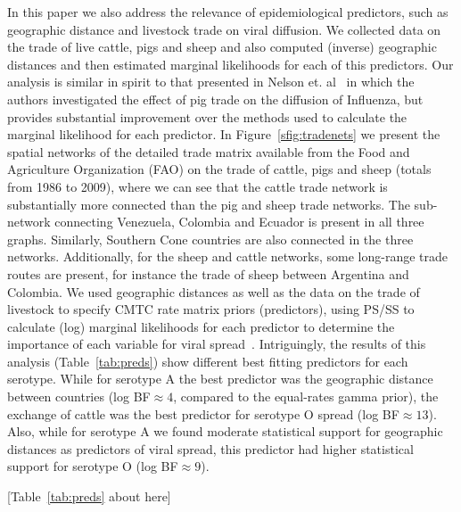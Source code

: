 \documentclass[10pt]{article}
\begin{document}
In this paper we also address the relevance of epidemiological predictors, such as geographic distance and livestock trade on viral diffusion.
We collected data on the trade of live cattle, pigs and sheep and also computed (inverse) geographic distances and then estimated marginal likelihoods  for each of this predictors.
Our analysis is similar in spirit to that presented in Nelson et. al~\cite{Nelson2011} in which the authors investigated the effect of pig trade on the diffusion of Influenza, but provides substantial improvement over the methods used to calculate the marginal likelihood for each predictor.
In Figure~\ref{sfig:tradenets} we present the spatial networks of the detailed trade matrix available from the Food and Agriculture Organization (FAO) on the trade of cattle, pigs and sheep (totals from 1986 to 2009), where we can see that the cattle trade network is substantially more connected than the pig and sheep trade networks.%
The sub-network connecting Venezuela, Colombia and Ecuador is present in all three graphs.
Similarly, Southern Cone countries are also connected in the three networks.
Additionally, for the sheep and cattle networks, some long-range trade routes are present, for instance the trade of sheep between Argentina and Colombia.
We used geographic distances as well as the data on the trade of livestock to specify CMTC rate matrix priors (predictors), using PS/SS to calculate (log) marginal likelihoods for each predictor to determine the importance of each variable for viral spread~\cite{Carvalho2013, Nelson2011}.
Intriguingly, the results of this analysis (Table~\ref{tab:preds}) show different best fitting predictors for each serotype.
While for serotype A the best predictor was the geographic distance between countries (log BF$\approx 4$, compared to the equal-rates gamma prior), the exchange of cattle was the best predictor for serotype O spread (log BF$\approx 13$). 
Also, while for serotype A we found moderate statistical support for geographic distances as predictors of viral spread, this predictor had higher statistical support for serotype O (log BF$\approx 9$).

\begin{center}
 [Table~\ref{tab:preds} about here]
\end{center}
\end{document}
